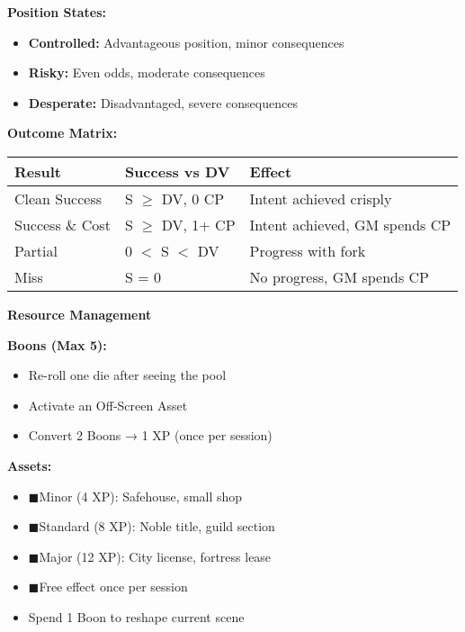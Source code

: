 \documentclass[10pt]{article}
\newcommand{\boon}{\textcolor{orange}{\ding{72}}}
\newcommand{\asset}{\textcolor{green!60!black}{$\blacksquare$}}
\begin{document}
\begin{mdframed}[backgroundcolor=background, linewidth=0pt, roundcorner=5pt]
\begin{adjustwidth}{0.2cm}{0.2cm}
\textbf{Position States:}
\begin{itemize}[leftmargin=*]
\item \textbf{Controlled:} Advantageous position, minor consequences
\item \textbf{Risky:} Even odds, moderate consequences  
\item \textbf{Desperate:} Disadvantaged, severe consequences
\end{itemize}

\textbf{Outcome Matrix:}
\begin{center}
\begin{tabular}{|l|l|l|}
\hline
\cellcolor{lightaccent} \textbf{Result} & \cellcolor{lightaccent} \textbf{Success vs DV} & \cellcolor{lightaccent} \textbf{Effect} \\
\hline
Clean Success & S $\geq$ DV, 0 CP & Intent achieved crisply \\
Success \& Cost & S $\geq$ DV, 1+ CP & Intent achieved, GM spends CP \\
Partial & 0 $<$ S $<$ DV & Progress with fork \\
Miss & S = 0 & No progress, GM spends CP \\
\hline
\end{tabular}
\end{center}
\end{adjustwidth}

\vspace{0.3cm}

\begin{mdframed}[backgroundcolor=sectionbg, linewidth=1pt, linecolor=accentcolor, roundcorner=3pt]
\textbf{\large Resource Management}
\end{mdframed}

\begin{adjustwidth}{0.2cm}{0.2cm}
\vspace{0.2cm}
\textbf{Boons (Max 5):}
\begin{itemize}[leftmargin=*]
\item \boon Re-roll one die after seeing the pool
\item \boon Activate an Off-Screen Asset
\item \boon Convert 2 Boons → 1 XP (once per session)
\end{itemize}

\textbf{Assets:}
\begin{itemize}[leftmargin=*]
\item \asset Minor (4 XP): Safehouse, small shop
\item \asset Standard (8 XP): Noble title, guild section
\item \asset Major (12 XP): City license, fortress lease
\item \asset Free effect once per session
\item Spend 1 Boon to reshape current scene
\end{itemize}


\end{adjustwidth}
\end{mdframed}
\end{document}

